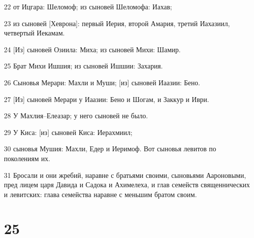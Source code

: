 \par 22 от Ицгара: Шеломоф; из сыновей Шеломофа: Иахав;
\par 23 из сыновей [Хеврона]: первый Иерия, второй Амария, третий Иахазиил, четвертый Иекамам.
\par 24 [Из] сыновей Озиила: Миха; из сыновей Михи: Шамир.
\par 25 Брат Михи Ишшия; из сыновей Ишшии: Захария.
\par 26 Сыновья Мерари: Махли и Муши; [из] сыновей Иаазии: Бено.
\par 27 [Из] сыновей Мерари у Иаазии: Бено и Шогам, и Заккур и Иври.
\par 28 У Махлия--Елеазар; у него сыновей не было.
\par 29 У Киса: [из] сыновей Киса: Иерахмиил;
\par 30 сыновья Мушия: Махли, Едер и Иеримоф. Вот сыновья левитов по поколениям их.
\par 31 Бросали и они жребий, наравне с братьями своими, сыновьями Аароновыми, пред лицем царя Давида и Садока и Ахимелеха, и глав семейств священнических и левитских: глава семейства наравне с меньшим братом своим.

\chapter{25}

